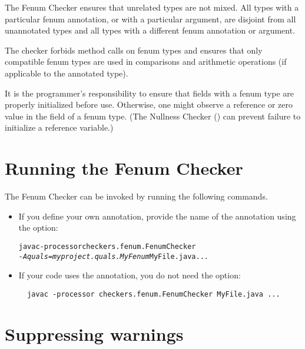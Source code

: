 The Fenum Checker ensures that unrelated types are not mixed. 
All types with a particular fenum annotation, or  with a particular  argument, are
disjoint from all unannotated types and all types with a different fenum
annotation or  argument.

The checker forbids method calls on fenum types and ensures that
only compatible fenum types are used in comparisons and arithmetic operations
(if applicable to the annotated type).

It is the programmer's responsibility to ensure that fields with a fenum type
are properly initialized before use.  Otherwise, one might observe a 
reference or zero value in the field of a fenum type.  (The Nullness Checker
() can prevent failure to initialize a
reference variable.)


\section{Running the Fenum Checker\label{fenum-running}}

The Fenum Checker can be invoked by running the following commands.

\begin{itemize}
  \item 
If you define your own annotation, provide the name of the annotation using the
 option:

\begin{alltt}
  javac -processor checkers.fenum.FenumChecker
        \textit{-Aquals=myproject.quals.MyFenum} MyFile.java ...
\end{alltt}


\item
If your code uses the  annotation, you do
not need the  option:

\begin{Verbatim}
  javac -processor checkers.fenum.FenumChecker MyFile.java ...
\end{Verbatim}

\end{itemize}



\section{Suppressing warnings\label{fenum-suppressing}}

